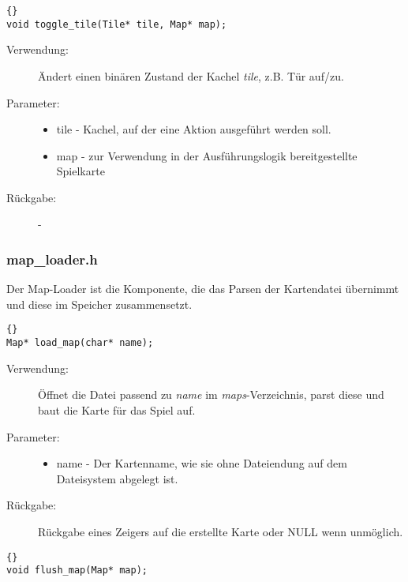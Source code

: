 \documentclass[11pt,a4paper,notitlepage]{report}
\begin{document}
		\begin{lstlisting}[caption=toggle\_tile]{}
void toggle_tile(Tile* tile, Map* map);
		\end{lstlisting}
		
	\begin{description}
		\item[Verwendung:] Ändert einen binären Zustand der Kachel \textit{tile}, z.B. Tür auf/zu.
		\item[Parameter:] \hfill
		\begin{itemize}
			\item tile - Kachel, auf der eine Aktion ausgeführt werden soll.
			\item map - zur Verwendung in der Ausführungslogik bereitgestellte Spielkarte
		\end{itemize}
		\item[Rückgabe:] -
	\end{description}
	
	\newpage
	\subsubsection*{map\_loader.h}
	Der Map-Loader ist die Komponente, die das Parsen der Kartendatei übernimmt und diese im Speicher zusammensetzt.
	
		\begin{lstlisting}[caption=load\_map]{}
Map* load_map(char* name);
		\end{lstlisting}
		
	\begin{description}
		\item[Verwendung:] Öffnet die Datei passend zu \textit{name} im \textit{maps}-Verzeichnis, parst diese und baut die Karte für das Spiel auf.
		\item[Parameter:] \hfill
		\begin{itemize}
			\item name - Der Kartenname, wie sie ohne Dateiendung auf dem Dateisystem abgelegt ist.
		\end{itemize}
		\item[Rückgabe:] Rückgabe eines Zeigers auf die erstellte Karte oder NULL wenn unmöglich.
	\end{description}
	
		\begin{lstlisting}[caption=flush\_map]{}
void flush_map(Map* map);
		\end{lstlisting}
		
\end{document}

